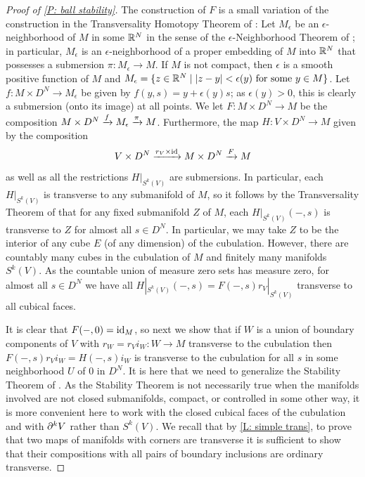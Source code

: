 \begin{proof}[Proof of \cref{P: ball stability}]
The construction of $F$ is a small variation of the construction in the Transversality Homotopy Theorem of \cite[Section 2.3]{GuPo74}:
Let $M_\epsilon$ be an $\epsilon$-neighborhood of $M$ in some $\mathbb{R}^N$ in the sense of the $\epsilon$-Neighborhood Theorem of \cite[Section 2.3]{GuPo74}; in particular,
$M_\epsilon$ is an $\epsilon$-neighborhood of a proper embedding of $M$ into $\mathbb{R}^N$ that possesses a submersion $\pi: M_\epsilon\to M$. If $M$ is not compact, then $\epsilon$ is a smooth positive function of $M$ and $M_\epsilon=\{z\in \mathbb{R}^N\mid |z-y|<\epsilon(y) \text{ for some }y\in M\}$. Let $f: M\times D^N\to M_\epsilon$ be given by $f(y, s)=y + \epsilon(y) s$; as $\epsilon(y)>0$, this is clearly a submersion (onto its image) at all points. 
We let $F:M\times D^N\to M$ be the composition $M\times D^N\xrightarrow{f}M_\epsilon \xrightarrow{\pi}M$. 
Furthermore, the map $H:V\times D^N\to M$ given by the composition $$V\times D^N\xrightarrow{r_V\times \mathrm{id}} M\times D^N\xrightarrow{F} M$$ as well as all the restrictions $H|_{S^k(V)}$   
are submersions.
In particular, each $H|_{S^k(V)}$ is transverse to any submanifold of $M$, so it follows by the Transversality Theorem of \cite[Section 2.3]{GuPo74} that for any fixed submanifold $Z$ of $M$, each $H|_{S^k(V)}(-,s)$ is transverse to $Z$ for almost all $s\in D^N$. In particular, we may take $Z$ to be the interior of any cube $E$ (of any dimension) of the cubulation. However, there are countably many cubes in the cubulation of $M$ and finitely many manifolds $S^k(V)$. As the countable union of measure zero sets has measure zero, for almost all $s\in D^N$ we have all $H|_{S^k(V)}(-,s)=F(-,s)r_V|_{S^k(V)}$  transverse to all cubical faces. 

It is clear that $F(-,0)=\mathrm{id}_M$, so next we show that if $W$ is a union of boundary components of $V$ with $r_W=r_Vi_W:W\to M$ transverse to the cubulation  then $F(-,s)r_Vi_W= H(-,s)i_W$ is transverse to the cubulation for all $s$ in some neighborhood $U$ of $0$ in $D^N$. It is here that we need to generalize the Stability Theorem of \cite[Section 1.6]{GuPo74}. As the Stability Theorem is not necessarily true when the manifolds involved are not closed submanifolds, compact, or controlled in some other way, it is more convenient here to work with the closed cubical faces of the cubulation and with $\partial^kV$ rather than $S^k(V)$. We recall that by \cref{L: simple trans}, to prove that two maps of manifolds with corners are transverse it is sufficient to show that their compositions with all pairs of boundary inclusions are ordinary transverse. 



\end{proof}
